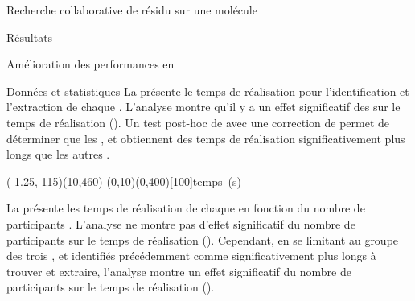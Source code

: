 \documentclass[myfrancais,ngerman,english,frenchb]{mythesis}
\begin{document}
\begin{mychapter}{Recherche collaborative de résidu sur une molécule}
\begin{mysection}{Résultats}
\begin{mysubsection}{Amélioration des performances en }
\begin{mysubsubsection}{Données et statistiques}
					La  présente le temps de réalisation  pour l'identification et l'extraction de chaque  .
					L'analyse montre qu'il y a un effet significatif des   sur le temps de réalisation  ().
					Un test post-hoc de  avec une correction de  permet de déterminer que les  ,  et  obtiennent des temps de réalisation significativement plus longs que les autres .

					\begin{myfigure}
						\begin{myps}(-1.25,-115)(10,460)
							\myaxes(0,10){}(0,400)[100]{temps~(s)}
						\end{myps}
					\end{myfigure}

					La  présente les temps de réalisation  de chaque   en fonction du nombre de participants .
					L'analyse ne montre pas d'effet significatif du nombre de participants  sur le temps de réalisation  ().
					Cependant, en se limitant au groupe des trois  ,  et  identifiés précédemment comme significativement plus longs à trouver et extraire, l'analyse montre un effet significatif du nombre de participants  sur le temps de réalisation  ().


\end{mysubsubsection}
\end{mysubsection}
\end{mysection}
\end{mychapter}
\end{document}
